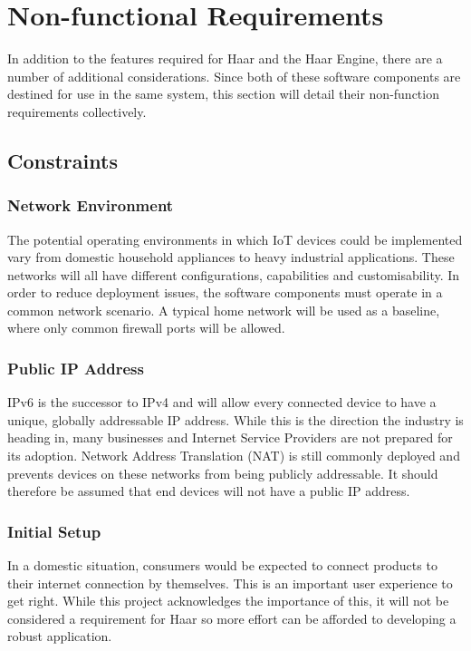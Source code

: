   \section{Non-functional Requirements}
    In addition to the features required for Haar and the Haar Engine, there are a number of additional considerations. Since both of these software components are destined for use in the same system, this section will detail their non-function requirements collectively.

    \subsection{Constraints}
      \subsubsection{Network Environment}
        The potential operating environments in which IoT devices could be implemented vary from domestic household appliances to heavy industrial applications. These networks will all have different configurations, capabilities and customisability. In order to reduce deployment issues, the software components must operate in a common network scenario. A typical home network will be used as a baseline, where only common firewall ports will be allowed.

      \subsubsection{Public IP Address}
        IPv6 is the successor to IPv4 and will allow every connected device to have a unique, globally addressable IP address. While this is the direction the industry is heading in, many businesses and Internet Service Providers are not prepared for its adoption. Network Address Translation (NAT) is still commonly deployed and prevents devices on these networks from being publicly addressable. It should therefore be assumed that end devices will not have a public IP address.

      \subsubsection{Initial Setup}
        In a domestic situation, consumers would be expected to connect products to their internet connection by themselves. This is an important user experience to get right. While this project acknowledges the importance of this, it will not be considered a requirement for Haar so more effort can be afforded to developing a robust application.

